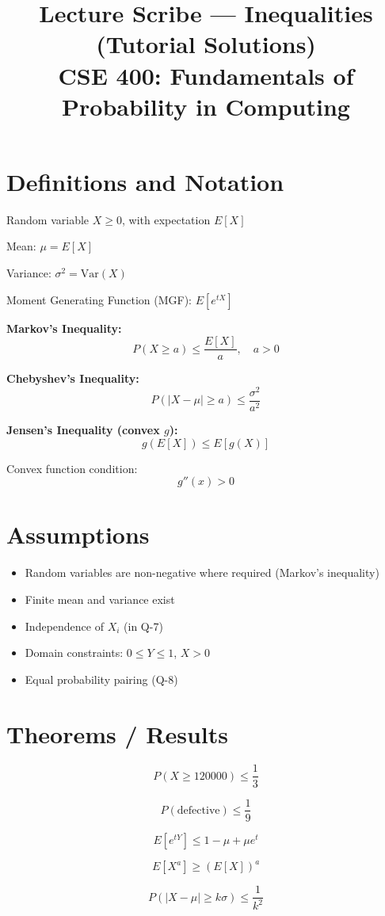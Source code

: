 \documentclass[12pt]{article}
\title{Lecture Scribe — Inequalities (Tutorial Solutions)\\
CSE 400: Fundamentals of Probability in Computing}
\date{}
\begin{document}
\maketitle

\section*{Definitions and Notation}

Random variable $X \ge 0$, with expectation $E[X]$

Mean: $\mu = E[X]$

Variance: $\sigma^2 = \mathrm{Var}(X)$

Moment Generating Function (MGF): $E[e^{tX}]$

\textbf{Markov’s Inequality:}
\[
P(X \ge a) \le \frac{E[X]}{a}, \quad a > 0
\]

\textbf{Chebyshev’s Inequality:}
\[
P(|X - \mu| \ge a) \le \frac{\sigma^2}{a^2}
\]

\textbf{Jensen’s Inequality (convex $g$):}
\[
g(E[X]) \le E[g(X)]
\]

Convex function condition:
\[
g''(x) > 0
\]

\section*{Assumptions}

\begin{itemize}
\item Random variables are non-negative where required (Markov’s inequality)
\item Finite mean and variance exist
\item Independence of $X_i$ (in Q-7)
\item Domain constraints: $0 \le Y \le 1$, $X > 0$
\item Equal probability pairing (Q-8)
\end{itemize}

\section*{Theorems / Results}

\[
P(X \ge 120000) \le \frac{1}{3}
\]

\[
P(\text{defective}) \le \frac{1}{9}
\]

\[
E[e^{tY}] \le 1 - \mu + \mu e^t
\]

\[
E[X^a] \ge (E[X])^a
\]

\[
P(|X - \mu| \ge k\sigma) \le \frac{1}{k^2}
\]
\end{document}
